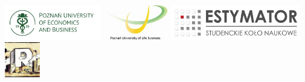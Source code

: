 \documentclass[11pt,a4paper]{letter}\usepackage[]{graphicx}\usepackage[]{color}
\begin{document}
\begin{letter}
\begin{center}
\includegraphics[height=0.6in]{uep}
\includegraphics[height=0.6in]{up}
\includegraphics[height=0.6in]{logo-estym}
\includegraphics[height=0.6in]{logo-erum}
\end{center}
\end{letter}
\end{document}
